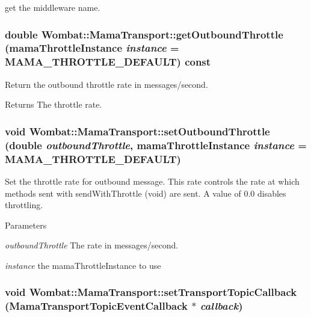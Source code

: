 get the middleware name. \hypertarget{classWombat_1_1MamaTransport_a9b655776b7f3c20f83e1dca446194551}{
\subsubsection[{getOutboundThrottle}]{\setlength{\rightskip}{0pt plus 5cm}double Wombat::MamaTransport::getOutboundThrottle (mamaThrottleInstance {\em instance} = {\ttfamily MAMA\_\-THROTTLE\_\-DEFAULT}) const}}
\label{classWombat_1_1MamaTransport_a9b655776b7f3c20f83e1dca446194551}


Return the outbound throttle rate in messages/second. \begin{DoxyReturn}{Returns}
The throttle rate. 
\end{DoxyReturn}
\hypertarget{classWombat_1_1MamaTransport_a49a60259218d8326cfd95041ded1a0e2}{
\subsubsection[{setOutboundThrottle}]{\setlength{\rightskip}{0pt plus 5cm}void Wombat::MamaTransport::setOutboundThrottle (double {\em outboundThrottle}, \/  mamaThrottleInstance {\em instance} = {\ttfamily MAMA\_\-THROTTLE\_\-DEFAULT})}}
\label{classWombat_1_1MamaTransport_a49a60259218d8326cfd95041ded1a0e2}


Set the throttle rate for outbound message. This rate controls the rate at which methods sent with sendWithThrottle (void) are sent. A value of 0.0 disables throttling.


\begin{DoxyParams}{Parameters}
\item[{\em outboundThrottle}]The rate in messages/second. \item[{\em instance}]the mamaThrottleInstance to use \end{DoxyParams}
\hypertarget{classWombat_1_1MamaTransport_ac3750ad8df8203d256467021c26efd35}{
\subsubsection[{setTransportTopicCallback}]{\setlength{\rightskip}{0pt plus 5cm}void Wombat::MamaTransport::setTransportTopicCallback ({\bf MamaTransportTopicEventCallback} $\ast$ {\em callback})}}
\label{classWombat_1_1MamaTransport_ac3750ad8df8203d256467021c26efd35}


